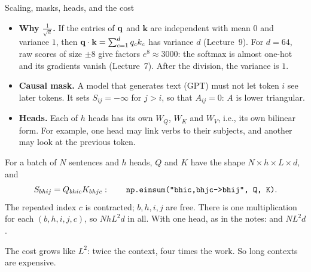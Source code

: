 \documentclass[aspectratio=1610,11pt]{beamer}
\begin{document}
\begin{frame}{Scaling, masks, heads, and the cost}
    \small
    \begin{itemize}
        \item \textbf{Why $\frac{1}{\sqrt d}$.} If the entries of $\mathbf{q}$ and $\mathbf{k}$ are independent with mean $0$ and variance $1$, then $\mathbf{q} \cdot \mathbf{k} = \sum_{c=1}^d q_ck_c$ has variance $d$ (Lecture~9). For $d = 64$, raw scores of size $\pm 8$ give factors $e^8 \approx 3000$: the softmax is almost one-hot and its gradients vanish (Lecture~7). After the division, the variance is $1$.
        \item \textbf{Causal mask.} A model that generates text (GPT) must not let token $i$ see later tokens. It sets $S_{ij} = -\infty$ for $j > i$, so that $A_{ij} = 0$: $A$ is lower triangular.
        \item \textbf{Heads.} Each of $h$ heads has its own $W_Q$, $W_K$ and $W_V$, i.e., its own bilinear form. For example, one head may link verbs to their subjects, and another may look at the previous token.
    \end{itemize}
    \begin{example}
        \small For a batch of $N$ sentences and $h$ heads, $Q$ and $K$ have the shape $N \times h \times L \times d$, and
        \[S_{bhij} = Q_{bhic}K_{bhjc}: \qquad \text{\py{np.einsum("bhic,bhjc->bhij", Q, K)}}.\]
        The repeated index $c$ is contracted; $b, h, i, j$ are free. There is one multiplication for each $(b, h, i, j, c)$, so $NhL^2d$ in all. With one head, as in the notes:  and $NL^2d$.
    \end{example}
    The cost grows like $L^2$: twice the context, four times the work. So long contexts are expensive.
\end{frame}

\end{document}
